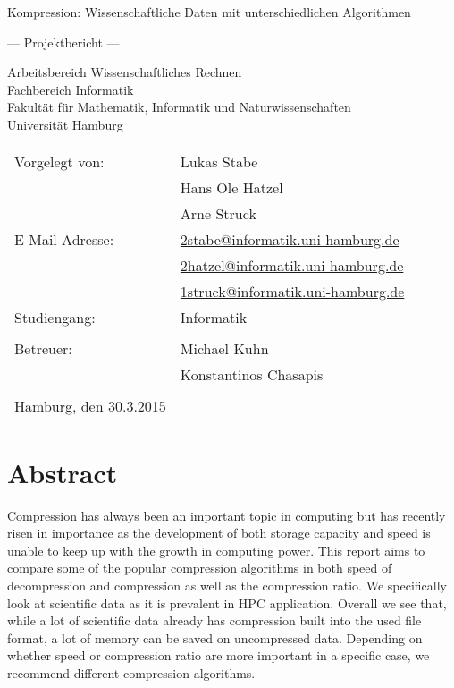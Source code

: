 \documentclass[
	12pt,
	a4paper,
	BCOR10mm,
	DIV14,
	listof=totoc,
	bibliography=totoc,
	headsepline
]{scrreprt}
\begin{document}
\begin{titlepage}
	\begin{center}
		{\titlefont\huge Kompression: Wissenschaftliche Daten mit unterschiedlichen Algorithmen \par}

		\bigskip
		\bigskip

		{\titlefont\Large --- Projektbericht ---\par}

		\bigskip
		\bigskip

		{\large Arbeitsbereich Wissenschaftliches Rechnen\\
		Fachbereich Informatik\\
		Fakultät für Mathematik, Informatik und Naturwissenschaften\\
		Universität Hamburg\par}
	\end{center}

	\vfill

	{\large \begin{tabular}{ll}
		Vorgelegt von: & Lukas Stabe \\
			& Hans Ole Hatzel \\
			& Arne Struck \\
		E-Mail-Adresse: 
			& \href{mailto:2stabe@informatik.uni-hamburg.de} {2stabe@informatik.uni-hamburg.de} \\			
			& \href{mailto:2hatzel@informatik.uni-hamburg.de}{2hatzel@informatik.uni-hamburg.de} \\
			& \href{mailto:1struck@informatik.uni-hamburg.de}{1struck@informatik.uni-hamburg.de} \\ 
		Studiengang: & Informatik \\
		\\
		Betreuer: & Michael Kuhn \\
			& Konstantinos Chasapis \\
		\\
		Hamburg, den 30.3.2015
	\end{tabular}\par}
\end{titlepage}

\chapter*{Abstract}
Compression has always been an important topic in computing but has recently risen in importance as the development of both storage capacity and speed is unable to keep up with the growth in computing power.
This report aims to compare some of the popular compression algorithms in both speed of decompression and compression as well as the compression ratio. We specifically look at scientific data as it is prevalent in HPC application.
Overall we see that, while a lot of scientific data already has compression built into the used file format, a lot of memory can be saved on uncompressed data.
Depending on whether speed or compression ratio are more important in a specific case, we recommend different compression algorithms.
\thispagestyle{empty}
\end{document}
